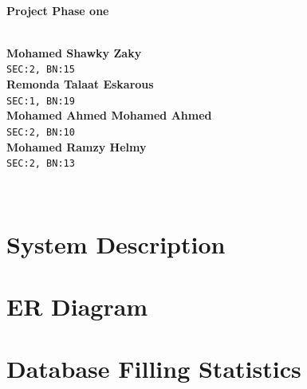 \documentclass[a4paper,12pt]{article}
\begin{document}
\begin{titlepage}

\HRule \\[0.4cm]
{ \huge \bfseries Project Phase one}\\[0.4cm] %
\HRule \\[1cm]
 
\begin{minipage}{0.8\textwidth}
\begin{flushleft} 
\textbf{Mohamed Shawky Zaky} \\
\texttt{SEC:2, BN:15} \\[0.5cm]

\textbf{Remonda Talaat Eskarous} \\
\texttt{SEC:1, BN:19} \\[0.5cm]

\textbf{Mohamed Ahmed Mohamed Ahmed} \\
\texttt{SEC:2, BN:10} \\[0.5cm]

\textbf{Mohamed Ramzy Helmy} \\
\texttt{SEC:2, BN:13}

\end{flushleft}
\end{minipage}\\[6cm]

\end{titlepage}

\thispagestyle{empty}

\tableofcontents
\listoffigures
\clearpage


\section{System Description}


\newpage

\section{ER Diagram}


\newpage

\section{Database Filling Statistics}

\end{document}
